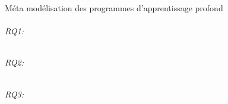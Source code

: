 Méta modélisation des programmes d'apprentissage profond\\




\emph{\\RQ1:\RQOne} %

\emph{\\RQ2:\RQTwo} %

\emph{\\RQ3:\RQThree} %

